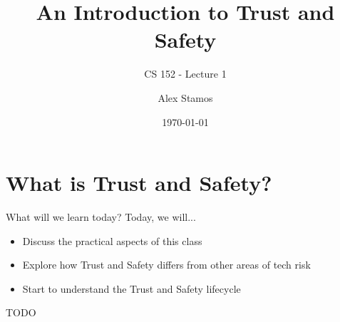 \documentclass[nobackground,dvipsnames,table]{beamer}
\title{An Introduction to Trust and Safety}
\subtitle{CS 152 - Lecture 1}
\author[A. Stamos]{Alex Stamos}
\institute[SIO]{\large Stanford Internet Observatory}
\date[2022]{\today}
\begin{document}
\coverpage

\begin{frame}
    \titlepage
\end{frame}

\section{What is Trust and Safety?}

\begin{frame}{What will we learn today?}
    Today, we will...
    \begin{itemize}
        \item Discuss the practical aspects of this class
        \item Explore how Trust and Safety differs from other areas of tech risk
        \item Start to understand the Trust and Safety lifecycle
    \end{itemize}
\end{frame}

\begin{frame}{TODO}
\end{frame}
\end{document}
